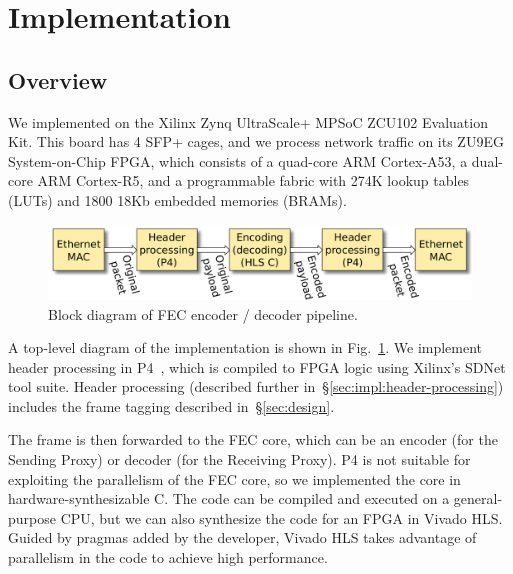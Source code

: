 \section{Implementation}
\label{sec:implementation}

\subsection{Overview}
We implemented \OurSys
on the Xilinx Zynq UltraScale+ MPSoC ZCU102 Evaluation Kit.  This board has 4 SFP+ cages, and we process network traffic on its
ZU9EG System-on-Chip FPGA, which consists of a quad-core ARM Cortex-A53, a
dual-core ARM Cortex-R5, and a programmable fabric with 274K lookup tables
(LUTs) and 1800 18Kb embedded memories (BRAMs).

\begin{figure}
  \centering
  \includegraphics[width=0.4\paperwidth]{Top_level.pdf}
  \caption{\label{fig:toplevel} Block diagram of FEC encoder / decoder pipeline.
  }
\end{figure}

A top-level diagram of the implementation is shown in Fig.~\ref{fig:toplevel}.
%
We implement header processing in
P4~\cite{Bosshart:2014:PPP:2656877.2656890}, which is compiled to FPGA
logic using Xilinx's SDNet tool suite.  Header processing (described
further in~\S\ref{sec:impl:header-processing}) includes the frame
tagging described in~\S\ref{sec:design}.

The frame is then forwarded to the FEC core, which can be an encoder (for the Sending Proxy) or decoder (for the
Receiving Proxy).
P4 is not suitable
for
exploiting the parallelism of the FEC core, so we implemented the core in
hardware-synthesizable C. The code can be compiled and executed on a
general-purpose CPU, but we can also synthesize the code for an FPGA
in Vivado HLS.  Guided by pragmas added by the developer, Vivado HLS takes
advantage of parallelism in the code to 
achieve  high performance.

